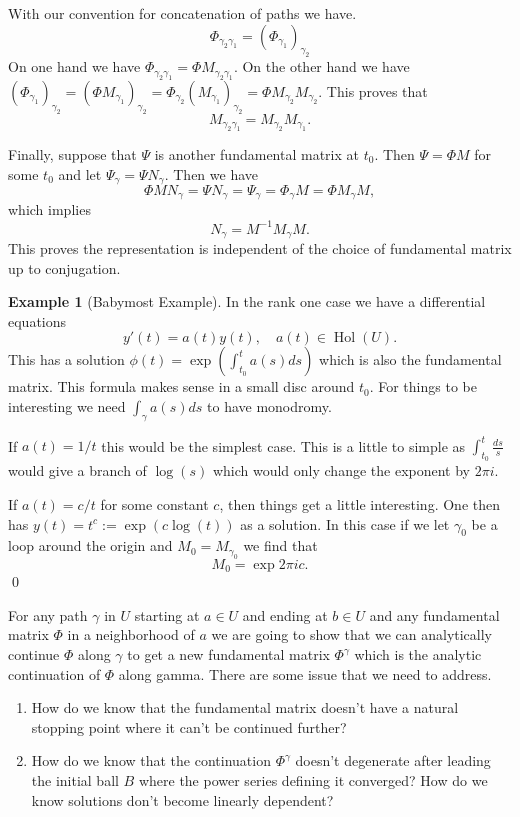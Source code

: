 \documentclass[12pt]{book}
\numberwithin{equation}{section}
\theoremstyle{definition}
\newtheorem{example}[theorem]{Example}
\theoremstyle{remark}
\newcommand{\hol}{\operatorname{Hol}}
\begin{document}
With our convention for concatenation of paths we have.
 $$ \Phi_{\gamma_2\gamma_1} = (\Phi_{\gamma_1})_{\gamma_2}$$
On one hand we have $\Phi_{\gamma_2\gamma_1} = \Phi M_{\gamma_2\gamma_1}.$
On the other hand we have $ (\Phi_{\gamma_1})_{\gamma_2}= (\Phi M_{\gamma_1})_{\gamma_2} = \Phi_{\gamma_2} (M_{\gamma_1})_{\gamma_2} = \Phi M_{\gamma_2} M_{\gamma_2}.$
This proves that 
 $$ M_{\gamma_2\gamma_1} = M_{\gamma_2}M_{\gamma_1}.$$

Finally, suppose that $\Psi$ is another fundamental matrix at $t_0$.
Then $\Psi = \Phi M$ for some $t_0$ and let $\Psi_{\gamma} = \Psi N_{\gamma}$. 
Then we have 
 $$\Phi M N_{\gamma} =\Psi N_{\gamma}  =\Psi_{\gamma} = \Phi_{\gamma} M = \Phi M_{\gamma} M, $$
which implies 
 $$ N_{\gamma} = M^{-1} M_{\gamma} M .$$
 This proves the representation is independent of the choice of fundamental matrix up to conjugation.

\begin{example}[Babymost Example]
	In the rank one case we have a differential equations 
	 $$ y'(t) = a(t) y(t), \quad a(t) \in \hol(U). $$
	This has a solution $\phi(t) = \exp( \int_{t_0}^t a(s) ds)$ which is also the fundamental matrix. 
	This formula makes sense in a small disc around $t_0$.
	For things to be interesting we need  $ \int_{\gamma} a(s) ds $ to have monodromy.
	
	If $a(t) = 1/t$ this would be the simplest case. 
	This is a little to simple as $\int_{t_0}^t \frac{ds}{s}$ would give a branch of $\log(s)$ which would only change the exponent by $2\pi i$.
	
	If $a(t) = c/t$ for some constant $c$, then things get a little interesting. 
	One then has $y(t) = t^{c} := \exp( c \log(t))$ as a solution. 
	In this case if we let $\gamma_0$ be a loop around the origin and $M_0 = M_{\gamma_0}$ we find that 
	$$M_{0} = \exp{2 \pi i c}.$$
	\qed
\end{example}

For any path $\gamma$ in $U$ starting at $a \in U$ and ending at $b\in U$ and any fundamental matrix $\Phi$ in a neighborhood of $a$ we are going to show that we can analytically continue $\Phi$ along $\gamma$ to get a new fundamental matrix $\Phi^{\gamma}$ which is the analytic continuation of $\Phi$ along gamma.
There are some issue that we need to address.
\begin{enumerate}
\item How do we know that the fundamental matrix doesn't have a natural stopping point where it can't be continued further?
\item How do we know that the continuation $\Phi^{\gamma}$ doesn't degenerate after leading the initial ball $B$ where the power series defining it converged? How do we know solutions don't become linearly dependent?
\end{enumerate}
\end{document}
